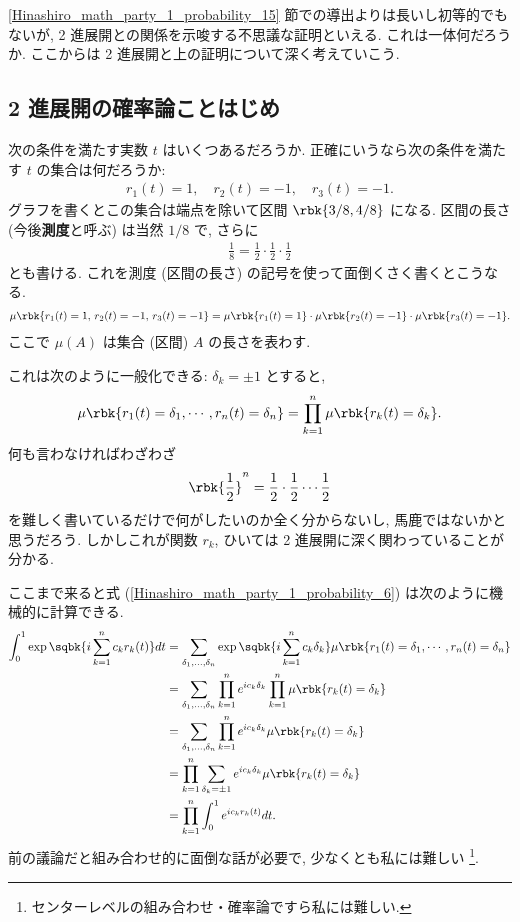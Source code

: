 \documentclass[openany, a4paper, oneside]{jsbook}
\begin{document}
\ref{Hinashiro_math_party_1_probability_15} 節での導出よりは長いし初等的でもないが, 2 進展開との関係を示唆する不思議な証明といえる.
これは一体何だろうか.
ここからは 2 進展開と上の証明について深く考えていこう.
\subsection{2 進展開の確率論ことはじめ \label{Hinashiro_math_party_1_probability_14}}

次の条件を満たす実数 $t$ はいくつあるだろうか.
正確にいうなら次の条件を満たす $t$ の集合は何だろうか:
\begin{align}
 r_1 (t) = 1,
 \quad r_2 (t) = -1,
 \quad r_3 (t) = -1.
\end{align}
グラフを書くとこの集合は端点を除いて区間 $\rbk{3/8, 4/8}$ になる.
区間の長さ (今後\textbf{測度}と呼ぶ) は当然 $1/8$ で, さらに
\begin{align}
 \frac{1}{8}
 =
 \frac{1}{2} \cdot \frac{1}{2} \cdot \frac{1}{2}
\end{align}
とも書ける.
これを測度 (区間の長さ) の記号を使って面倒くさく書くとこうなる.
\begin{align}
 \mu \rbk{r_1 (t) = 1, \, r_2 (t) = -1, \, r_3 (t) = -1}
 =
 \mu \rbk{r_1 (t)=1} \cdot \mu \rbk{r_2 (t)=-1} \cdot \mu \rbk{r_3 (t)=-1}.
\end{align}
ここで $\mu (A)$ は集合 (区間) $A$ の長さを表わす.

これは次のように一般化できる: $\delta_k = \pm 1$ とすると,
\begin{align}
 \mu \rbk{r_1 (t) = \delta_1, \cdots, r_n (t) = \delta_n}
 =
 \prod_{k=1}^{n} \mu \rbk{r_k (t)=\delta_k}. \label{Hinashiro_math_party_1_probability_7}
\end{align}
何も言わなければわざわざ
\begin{align}
 \rbk{\frac{1}{2}}^n
 =
 \frac{1}{2} \cdot \frac{1}{2} \cdots \frac{1}{2}
\end{align}
を難しく書いているだけで何がしたいのか全く分からないし, 馬鹿ではないかと思うだろう.
しかしこれが関数 $r_k$, ひいては 2 進展開に深く関わっていることが分かる.

ここまで来ると式 (\ref{Hinashiro_math_party_1_probability_6}) は次のように機械的に計算できる.
\begin{align}
 \int_0^1 \exp \sqbk{i \sum_{k=1}^n c_k r_k (t)} dt
 &=
 \sum_{\delta_1,\dots,\delta_n} \exp \sqbk{i \sum_{k=1}^{n} c_k \delta_k} \mu \rbk{r_1 (t) = \delta_1, \cdots, r_n (t) = \delta_n} \\
 &=
 \sum_{\delta_1,\dots,\delta_n} \prod_{k=1}^n e^{i c_k \delta_k} \prod_{k=1}^n \mu \rbk{r_k (t) = \delta_k} \\
 &=
 \sum_{\delta_1,\dots,\delta_n} \prod_{k=1}^n e^{i c_k \delta_k} \mu \rbk{r_k (t) = \delta_k} \\
 &=
 \prod_{k=1}^n \sum_{\delta_k = \pm 1} e^{i c_k \delta_k} \mu \rbk{r_k (t) = \delta_k} \\
 &=
 \prod_{k=1}^n \int_0^1 e^{i c_k r_k (t)} dt.
\end{align}
前の議論だと組み合わせ的に面倒な話が必要で, 少なくとも私には難しい \footnote{センターレベルの組み合わせ・確率論ですら私には難しい.}.
\end{document}
